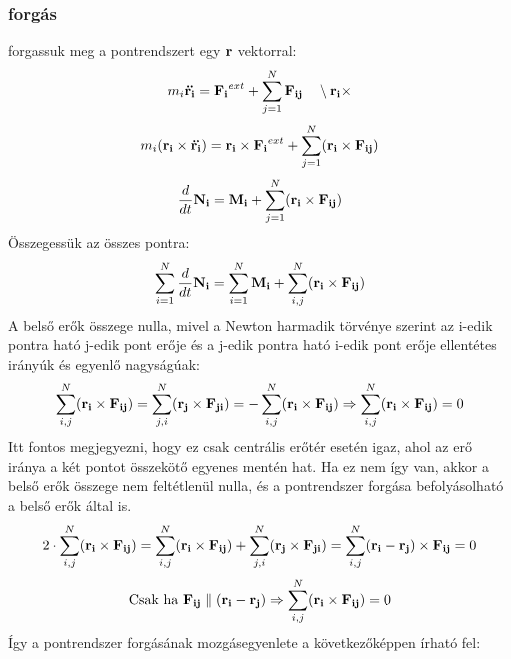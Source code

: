 \documentclass[a4paper,12pt]{article}
\begin{document}
\subsubsection{forgás}
forgassuk meg a pontrendszert egy $\bold{r}$ vektorral:
\begin{equation}
    m_i \bold{\ddot{r_i}} = \bold{F_i}^{ext} + \sum_{j=1}^{N} \bold{F_{ij}} \quad  \setminus \bold{r_i} \times
\end{equation}
\begin{equation}
    m_i (\bold{r_i} \times \bold{\ddot{r_i}}) = \bold{r_i} \times \bold{F_i}^{ext} + \sum_{j=1}^{N} (\bold{r_i} \times \bold{F_{ij}})
\end{equation}
\begin{equation}
    \frac{d}{dt} \bold{N_i} = \bold{M_i} + \sum_{j=1}^{N} (\bold{r_i} \times \bold{F_{ij}})
\end{equation}
Összegessük az összes pontra:
\begin{equation}
    \sum_{i=1}^{N} \frac{d}{dt} \bold{N_i} = \sum_{i=1}^{N} \bold{M_i} + \sum_{i,j}^{N} (\bold{r_i} \times \bold{F_{ij}})
\end{equation}
A belső erők összege nulla, mivel a Newton harmadik törvénye szerint az i-edik pontra ható j-edik pont erője és a j-edik pontra ható i-edik pont erője ellentétes irányúk és egyenlő nagyságúak:
\begin{equation}
    \sum_{i,j}^{N} (\bold{r_i} \times \bold{F_{ij}}) = \sum_{j,i}^{N} (\bold{r_j} \times \bold{F_{ji}}) = -\sum_{i,j}^{N} (\bold{r_i} \times \bold{F_{ij}}) \Rightarrow \sum_{i,j}^{N} (\bold{r_i} \times \bold{F_{ij}}) = 0
\end{equation}
Itt fontos megjegyezni, hogy ez csak centrális erőtér esetén igaz, ahol az erő iránya a két pontot összekötő egyenes mentén hat. Ha ez nem így van, akkor a belső erők összege nem feltétlenül nulla,
és a pontrendszer forgása befolyásolható a belső erők által is. 
\begin{equation}
    2 \cdot \sum_{i,j}^{N} (\bold{r_i} \times \bold{F_{ij}}) = \sum_{i,j}^{N} (\bold{r_i} \times \bold{F_{ij}}) + \sum_{j,i}^{N} (\bold{r_j} \times \bold{F_{ji}}) = \sum_{i,j}^{N} (\bold{r_i} - \bold{r_j}) \times \bold{F_{ij}} = 0
\end{equation}
\begin{equation}
    \text{Csak ha } \bold{F_{ij}} \parallel (\bold{r_i} - \bold{r_j}) \Rightarrow \sum_{i,j}^{N} (\bold{r_i} \times \bold{F_{ij}}) = 0
\end{equation}
Így a pontrendszer forgásának mozgásegyenlete a következőképpen írható fel:
\end{document}

